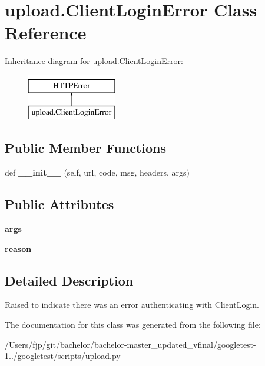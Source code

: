\hypertarget{classupload_1_1_client_login_error}{}\section{upload.\+Client\+Login\+Error Class Reference}
\label{classupload_1_1_client_login_error}
Inheritance diagram for upload.\+Client\+Login\+Error\+:\begin{figure}[H]
\begin{center}
\leavevmode
\includegraphics[height=2.000000cm]{classupload_1_1_client_login_error}
\end{center}
\end{figure}
\subsection*{Public Member Functions}
\begin{DoxyCompactItemize}
\item 
\mbox{\label{classupload_1_1_client_login_error_a1e590616c2976d881e155958cedbbe47}} 
def {\bfseries \+\_\+\+\_\+init\+\_\+\+\_\+} (self, url, code, msg, headers, args)
\end{DoxyCompactItemize}
\subsection*{Public Attributes}
\begin{DoxyCompactItemize}
\item 
\mbox{\label{classupload_1_1_client_login_error_ac300a0b034b2bc64cedc51e09fb6d663}} 
{\bfseries args}
\item 
\mbox{\label{classupload_1_1_client_login_error_ae0555feb182d89d1e4d7944afbfe14e5}} 
{\bfseries reason}
\end{DoxyCompactItemize}


\subsection{Detailed Description}
\begin{DoxyVerb}Raised to indicate there was an error authenticating with ClientLogin.\end{DoxyVerb}
 

The documentation for this class was generated from the following file\+:\begin{DoxyCompactItemize}
\item 
/\+Users/fjp/git/bachelor/bachelor-\/master\+\_\+updated\+\_\+vfinal/googletest-\/1../googletest/scripts/upload.\+py\end{DoxyCompactItemize}

